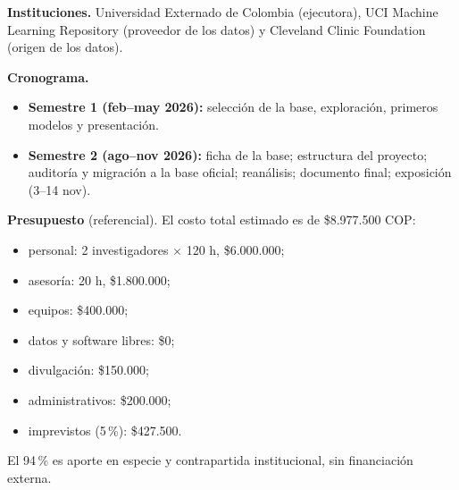 \documentclass[twocolumn,10pt]{article}
\begin{document}
\textbf{Instituciones.} Universidad Externado de Colombia (ejecutora), UCI Machine Learning Repository (proveedor de los datos) y Cleveland Clinic Foundation (origen de los datos).

\textbf{Cronograma.}
\begin{itemize}
\item \textbf{Semestre 1 (feb--may 2026):} selecci\'on de la base, exploraci\'on, primeros modelos y presentaci\'on.
\item \textbf{Semestre 2 (ago--nov 2026):} ficha de la base; estructura del proyecto; auditor\'ia y migraci\'on a la base oficial; rean\'alisis; documento final; exposici\'on (3--14 nov).
\end{itemize}

\textbf{Presupuesto} (referencial). El costo total estimado es de \$8.977.500 COP:
\begin{itemize}
\item personal: 2 investigadores $\times$ 120 h, \$6.000.000;
\item asesor\'ia: 20 h, \$1.800.000;
\item equipos: \$400.000;
\item datos y software libres: \$0;
\item divulgaci\'on: \$150.000;
\item administrativos: \$200.000;
\item imprevistos (5\,\%): \$427.500.
\end{itemize}
El 94\,\% es aporte en especie y contrapartida institucional, sin financiaci\'on externa.
\end{document}
